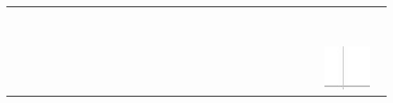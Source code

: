 \documentclass[10pt]{article}
\begin{document}
\begin{center}
\begin{tabular}{|c|c|c|c|c|c|c|c|c|c|c|c|c|c|c|c|c|c|c|c|c|c|c|c|c|c|c|c|c|c|}
\hline
 &  &  &  &  &  &  &  &  &  &  &  &  &  &  &  &  &  &  &  &  &  &  &  &  &  &  &  &  &  \\
\hline
 &  &  &  &  &  &  &  &  &  &  &  &  &  &  &  &  &  &  &  &  &  &  &  &  &  &  &  &  &  \\
\hline
 &  &  &  &  &  &  &  &  &  &  &  &  &  &  &  &  &  &  &  &  &  &  &  &  &  &  &  &  &  \\
\hline
 &  &  &  &  &  &  &  &  &  &  &  &  &  &  &  &  &  &  &  &  &  &  &  &  &  &  &  &  &  \\
\hline
 &  &  &  &  &  &  &  &  &  &  &  &  &  &  &  &  &  &  &  &  &  &  &  &  &  &  &  &  &  \\
\hline
 &  &  &  &  &  &  &  &  &  &  &  &  &  &  &  &  &  &  &  &  &  &  &  &  &  &  &  &  &  \\
\hline
 &  &  &  &  &  &  &  &  &  &  &  &  &  &  &  &  &  &  &  &  &  &  &  &  &  &  &  &  &  \\
\hline
 &  &  &  &  &  &  &  &  &  &  &  &  &  &  &  &  &  &  &  &  &  &  &  &  &  &  &  &  &  \\
\hline
 &  &  &  &  &  &  &  &  &  &  &  &  &  &  &  &  &  &  &  &  &  &  &  &  &  &  &  &  &  \\
\hline
 &  &  &  &  &  &  &  &  &  &  &  &  &  &  &  &  &  &  &  &  &  &  &  &  &  &  &  &  &  \\
\hline
 &  &  &  &  &  &  &  &  &  &  &  &  &  &  &  &  &  &  &  &  &  &  &  &  &  &  &  & \includegraphics[max width=\textwidth]{2024_11_21_94f02db55673a8a7b820g-12(9)}

\end{tabular}
\end{center}
\end{document}
